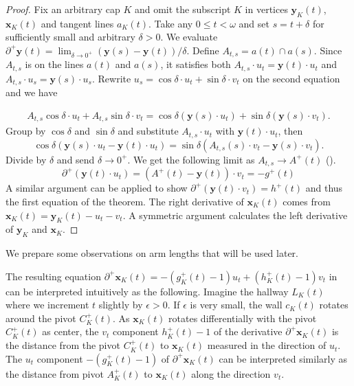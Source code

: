 \begin{proof}
Fix an arbitrary cap \(K\) and omit the subscript \(K\) in vertices \(\mathbf{y}_K(t)\), \(\mathbf{x}_K(t)\) and tangent lines \(a_K(t)\). Take any \(0 \leq t < \omega\) and set \(s = t + \delta\) for sufficiently small and arbitrary \(\delta > 0\). We evaluate \(\partial^+ \mathbf{y}(t) = \lim_{\delta \rightarrow 0^+}(\mathbf{y}(s) - \mathbf{y}(t)) / \delta\). Define \(A_{t, s} = a(t) \cap a(s)\). Since \(A_{t, s}\) is on the lines \(a(t)\) and \(a(s)\), it satisfies both \(A_{t, s} \cdot u_t = \mathbf{y}(t) \cdot u_t\) and \(A_{t, s} \cdot u_s = \mathbf{y}(s) \cdot u_s\). Rewrite \(u_s = \cos \delta \cdot u_t + \sin \delta \cdot v_t\) on the second equation and we have

\begin{align*}
	A_{t, s} \cos \delta \cdot u_t + A_{t, s} \sin \delta \cdot v_t =  	\cos \delta (\mathbf{y}(s) \cdot u_t) + \sin \delta (\mathbf{y}(s) \cdot v_t).
\end{align*}
Group by \(\cos \delta\) and \(\sin \delta\) and substitute \(A_{t, s} \cdot u_t\) with \(\mathbf{y}(t) \cdot u_t\), then
\[ \cos \delta (\mathbf{y}(s) \cdot u_t - \mathbf{y}(t) \cdot u_t)
	= \sin \delta (A_{t, s}  (s) \cdot v_t - \mathbf{y}(s) \cdot v_t) .
	\]
Divide by \(\delta\) and send \(\delta \to 0^+\). We get the following limit as \(A_{t, s} \to A^+(t)\) ().
\[ \partial^+ (\mathbf{y}(t) \cdot u_t)  = (A^+(t) - \mathbf{y}(t)) \cdot v_t = - g^+(t)\]
A similar argument can be applied to show \(\partial^+ (\mathbf{y}(t) \cdot v_t) = h^+(t)\) and thus the first equation of the theorem. The right derivative of \(\mathbf{x}_K(t)\) comes from \(\mathbf{x}_K(t) = \mathbf{y}_K(t) - u_t - v_t\). A symmetric argument calculates the left derivative of \(\mathbf{y}_K\) and \(\mathbf{x}_K\).
\end{proof}

We prepare some observations on arm lengths that will be used later.

\begin{remark}

The resulting equation \(\partial^+ \mathbf{x}_K(t) = -(g_K^+(t) - 1) u_t + (h_K^+(t) - 1) v_t\) in  can be interpreted intuitively as the following. Imagine the hallway \(L_K(t)\) where we increment \(t\) slightly by \(\epsilon > 0\). If \(\epsilon\) is very small, the wall \(c_K(t)\) rotates around the pivot \(C_K^+(t)\). As \(\mathbf{x}_K(t)\) rotates differentially with the pivot \(C_K^+(t)\) as center, the \(v_t\) component \(h_K^+(t) - 1\) of the derivative \(\partial^+ \mathbf{x}_K(t)\) is the distance from the pivot \(C_K^+(t)\) to \(\mathbf{x}_K(t)\) measured in the direction of \(u_t\). The \(u_t\) component \(-(g_K^+(t) - 1)\) of \(\partial^+ \mathbf{x}_K(t)\) can be interpreted similarly as the distance from pivot \(A^+_K(t)\) to \(\mathbf{x}_K(t)\) along the direction \(v_t\).

\label{rem:inner-corner-deriv}
\end{remark}

